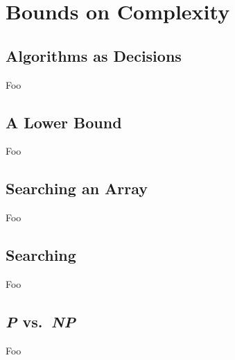 \section{Bounds on Complexity}

\subsection{Algorithms as Decisions}

Foo

\subsection{A Lower Bound}

Foo

\subsection{Searching an Array}

Foo

\subsection{Searching}

Foo

\subsection{\emph{P} vs.\ \emph{NP}}

Foo

